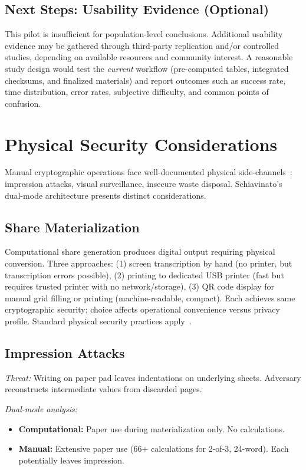 \documentclass[11pt]{article}
\begin{document}
\subsection{Next Steps: Usability Evidence (Optional)}

This pilot is insufficient for population-level conclusions. Additional usability evidence may be gathered through third-party replication and/or controlled studies, depending on available resources and community interest. A reasonable study design would test the \textit{current} workflow (pre-computed tables, integrated checksums, and finalized materials) and report outcomes such as success rate, time distribution, error rates, subjective difficulty, and common points of confusion.

\section{Physical Security Considerations}
\label{app:physical}

Manual cryptographic operations face well-documented physical side-channels~\cite{anderson2008}: impression attacks, visual surveillance, insecure waste disposal. Schiavinato's dual-mode architecture presents distinct considerations.

\subsection{Share Materialization}

Computational share generation produces digital output requiring physical conversion. Three approaches: (1) screen transcription by hand (no printer, but transcription errors possible), (2) printing to dedicated USB printer (fast but requires trusted printer with no network/storage), (3) QR code display for manual grid filling or printing (machine-readable, compact). Each achieves same cryptographic security; choice affects operational convenience versus privacy profile. Standard physical security practices apply~\cite{anderson2008}.

\subsection{Impression Attacks}

\textit{Threat:} Writing on paper pad leaves indentations on underlying sheets. Adversary reconstructs intermediate values from discarded pages.

\textit{Dual-mode analysis:}
\begin{itemize}[noitemsep]
    \item \textbf{Computational:} Paper use during materialization only. No calculations.
    \item \textbf{Manual:} Extensive paper use (66+ calculations for 2-of-3, 24-word). Each potentially leaves impression.
\end{itemize}
\end{document}
